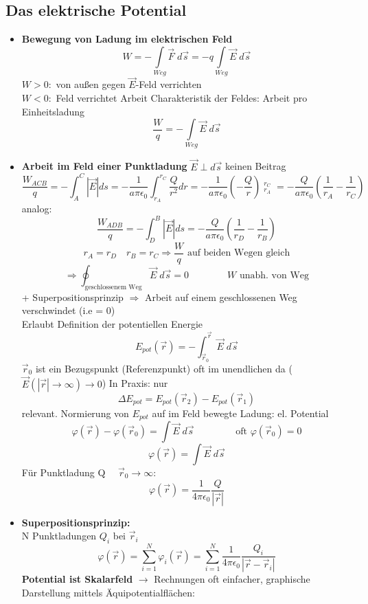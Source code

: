 \documentclass[titlepage,12pt,a4paper,ngerman]{report}
\begin{document}
\subsection{Das elektrische Potential}
\begin{itemize}
\item \textbf{Bewegung von Ladung im elektrischen Feld}
$$ W = -\int\limits_{Weg} \vec{F} \; d\vec{s} = -q \int\limits_{Weg} \vec{E} \;d\vec{s}$$
$ W>0:$ von außen gegen $\vec{E}$-Feld verrichten\\
$ W<0:$ Feld verrichtet Arbeit
Charakteristik der Feldes: Arbeit pro Einheitsladung
$$\frac{W}{q} = -\int\limits_{Weg} \vec{E}\;d\vec{s}$$
\item \textbf{Arbeit im Feld einer Punktladung}
$ \vec{E} \perp d\vec{s}$ keinen Beitrag
$$ \frac{W_{ACB}}{q} = -\int_{A}^C |\vec{E}| ds = -\dfrac{1}{a\pi\epsilon_0} \int_{r_A}^{r_C} \frac{Q}{r^2} dr =  -\dfrac{1}{a\pi\epsilon_0} (-\frac{Q}{r}) \mathop{\bigg|}_{r_A}^{r_C} =  -\dfrac{Q}{a\pi\epsilon_0} ( \frac{1}{r_A} - \frac{1}{r_C})$$
analog:
$$\frac{W_{ADB}}{q} = -\int_D^B |\vec{E}| ds =  -\dfrac{Q}{a\pi\epsilon_0} ( \frac{1}{r_D} - \frac{1}{r_B})$$
$$r_A = r_D \quad r_B = r_C \Rightarrow \frac{W}{q} \textrm{ auf beiden Wegen gleich}$$
$$\Rightarrow \oint_{\textrm{geschlossenem Weg}} \vec{E}\; d\vec{s} = 0 \qquad \qquad W \textrm{ unabh. von Weg}$$
+ Superpositionsprinzip $\Rightarrow$ Arbeit auf einem geschlossenen Weg verschwindet (i.e = 0)\\
Erlaubt Definition der potentiellen Energie
$$ E_{pot} (\vec{r}) = -\int_{\vec{r}_0}^{\vec{r}} \vec{E} \; d\vec{s} $$
$\vec{r}_0$ ist ein Bezugspunkt (Referenzpunkt) oft im unendlichen da ($\vec{E}( |\vec{r}| \rightarrow \infty) \rightarrow 0$)
In Praxis: nur
$$ \Delta E_{pot} = E_{pot}(\vec{r}_2) - E_{pot}(\vec{r}_1)$$
relevant.
Normierung von $E_{pot}$ auf im Feld bewegte Ladung:
el. Potential 
$$\varphi(\vec{r}) - \varphi (\vec{r}_0) = \int \vec{E} \; d \vec{s} \qquad \qquad \textrm{ oft } \varphi(\vec{r}_0) = 0$$
$$\varphi(\vec{r}) = \int \vec{E} \; d \vec{s}$$
Für Punktladung Q $\quad \vec{r}_0 \rightarrow \infty :$ $$\varphi(\vec{r}) = \frac{1}{4\pi\epsilon_0} \frac{Q}{|\vec{r}|}$$
\item \textbf{Superpositionsprinzip:}\\
N Punktladungen $Q_i$ bei $\vec{r}_i$
$$ \varphi(\vec{r}) = \sum_{i=1}^N \varphi_i(\vec{r}) = \sum_{i=1}^N \frac{1}{4\pi\epsilon_0} \frac{Q_i}{|\vec{r}-\vec{r}_i|}$$
\textbf{Potential ist Skalarfeld} $\rightarrow$ Rechnungen oft einfacher, graphische Darstellung mittels Äquipotentialflächen: \\

\end{itemize}
\end{document}
